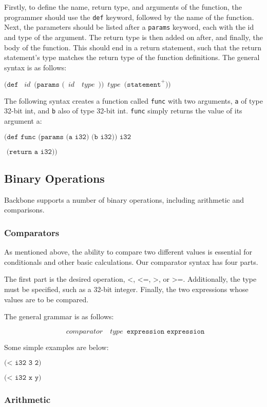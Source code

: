 \documentclass[journal=jacsat, manuscript=article]{achemso}
\begin{document}
Firstly, to define the name, return type, and arguments of the function, the programmer should use the \texttt{def} keyword, followed by the name of the function. Next, the parameters should be listed after a \texttt{params} keyword, each with the id and type of the argument. The return type is then added on after, and finally, the body of the function. This should end in a return statement, such that the return statement's type matches the return type of the function definitions.
The general syntax is as follows:

$\texttt{(def }\,\,\,id\,\,\,\texttt{(params (}\,\,\,id\,\,\,\,\,\,type\,\,\,\texttt{))}\,\,\,type\,\,\,\texttt{(statement}^+\texttt{))}$


The following syntax creates a function called \texttt{func} with two arguments, \texttt{a} of type 32-bit int, and \texttt{b} also of type 32-bit int. \texttt{func} simply returns the value of its argument a:

$\texttt{(def func (params (a i32) (b i32)) i32}$

$\texttt{  (return a i32))}$

\subsection{Binary Operations} 

Backbone supports a number of binary operations, including arithmetic and comparisons.

\subsubsection{Comparators}

As mentioned above, the ability to compare two different values is essential for conditionals and other basic calculations. Our comparator syntax has four parts.

The first part is the desired operation, <, <=, >, or >=. Additionally, the type must be specified, such as a 32-bit integer. Finally, the two expressions whose values are to be compared.

The general grammar is as follows:

$$\,\,\,comparator\,\,\,\,\,\,type\,\,\, \texttt{expression } \texttt{expression}$$

Some simple examples are below: 

$\texttt{(< i32 3 2)}$

$\texttt{(< i32 x y)}$

\subsubsection{Arithmetic}
\end{document}

